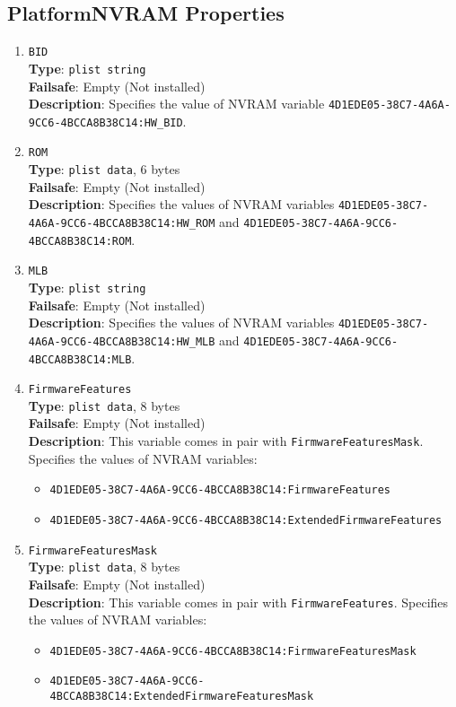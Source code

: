 \documentclass[]{article}
\makeatletter
\providecommand{\tightlist}{%
  \setlength{\itemsep}{0pt}\setlength{\parskip}{0pt}}
\renewcommand{\label}[1]{%
\zref@wrapper@immediate{\oldlabel{#1}}}  %
\makeatother
\begin{document}
\subsection{PlatformNVRAM Properties}\label{platforminfonvram}

\begin{enumerate}
\item
  \texttt{BID}\\
  \textbf{Type}: \texttt{plist\ string}\\
  \textbf{Failsafe}: Empty (Not installed)\\
  \textbf{Description}: Specifies the value of NVRAM variable
  \texttt{4D1EDE05-38C7-4A6A-9CC6-4BCCA8B38C14:HW\_BID}.

\item
  \texttt{ROM}\\
  \textbf{Type}: \texttt{plist\ data}, 6 bytes\\
  \textbf{Failsafe}: Empty (Not installed)\\
  \textbf{Description}: Specifies the values of NVRAM variables
  \texttt{4D1EDE05-38C7-4A6A-9CC6-4BCCA8B38C14:HW\_ROM} and
  \texttt{4D1EDE05-38C7-4A6A-9CC6-4BCCA8B38C14:ROM}.

\item
  \texttt{MLB}\\
  \textbf{Type}: \texttt{plist\ string}\\
  \textbf{Failsafe}: Empty (Not installed)\\
  \textbf{Description}: Specifies the values of NVRAM variables
  \texttt{4D1EDE05-38C7-4A6A-9CC6-4BCCA8B38C14:HW\_MLB} and
  \texttt{4D1EDE05-38C7-4A6A-9CC6-4BCCA8B38C14:MLB}.

\item
  \texttt{FirmwareFeatures}\\
  \textbf{Type}: \texttt{plist\ data}, 8 bytes\\
  \textbf{Failsafe}: Empty (Not installed)\\
  \textbf{Description}: This variable comes in pair with \texttt{FirmwareFeaturesMask}.
  Specifies the values of NVRAM variables:
  \begin{itemize}
  \tightlist
  \item \texttt{4D1EDE05-38C7-4A6A-9CC6-4BCCA8B38C14:FirmwareFeatures}
  \item \texttt{4D1EDE05-38C7-4A6A-9CC6-4BCCA8B38C14:ExtendedFirmwareFeatures}
  \end{itemize}

\item
  \texttt{FirmwareFeaturesMask}\\
  \textbf{Type}: \texttt{plist\ data}, 8 bytes\\
  \textbf{Failsafe}: Empty (Not installed)\\
  \textbf{Description}: This variable comes in pair with \texttt{FirmwareFeatures}.
  Specifies the values of NVRAM variables:
  \begin{itemize}
  \tightlist
  \item \texttt{4D1EDE05-38C7-4A6A-9CC6-4BCCA8B38C14:FirmwareFeaturesMask}
  \item \texttt{4D1EDE05-38C7-4A6A-9CC6-4BCCA8B38C14:ExtendedFirmwareFeaturesMask}
  \end{itemize}


\end{enumerate}
\end{document}
